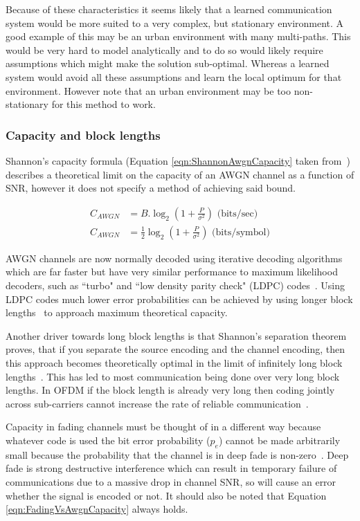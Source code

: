 \documentclass[12pt,onecolumn,letterpaper]{article}
\begin{document}
Because of these characteristics it seems likely that a learned communication system would be more suited to a very complex, but stationary environment. A good example of this may be an urban environment with many multi-paths. This would be very hard to model analytically and to do so would likely require assumptions which might make the solution sub-optimal. Whereas a learned system would avoid all these assumptions and learn the local optimum for that environment. However note that an urban environment may be too non-stationary for this method to work.

\subsubsection{Capacity and block lengths}

Shannon's capacity formula (Equation \ref{eqn:ShannonAwgnCapacity} taken from~\cite{WirelessTextbookC5}) describes a theoretical limit on the capacity of an AWGN channel as a function of SNR, however it does not specify a method of achieving said bound.

\begin{align}
    C_{AWGN} &= B.\log_2(1 + \frac{P}{\sigma^2})  \mbox{    (bits/sec)} \nonumber\\
    C_{AWGN} &= \frac{1}{2} \log_2(1 + \frac{P}{\sigma^2})  \mbox{    (bits/symbol)}
    \label{eqn:ShannonAwgnCapacity}
\end{align}

AWGN channels are now normally decoded using iterative decoding algorithms which are far faster but have very similar performance to maximum likelihood decoders, such as ``turbo" and ``low density parity check" (LDPC) codes~\cite{WirelessTextbookC5}. Using LDPC codes much lower error probabilities can be achieved by using longer block lengths~\cite{WirelessTextbookC5} to approach maximum theoretical capacity.

Another driver towards long block lengths is that Shannon's separation theorem proves, that if you separate the source encoding and the channel encoding, then this approach becomes theoretically optimal in the limit of infinitely long block lengths~\cite{ChannelEncodingOptimality}. This has led to most communication being done over very long block lengths. In OFDM if the block length is already very long then coding jointly across sub-carriers cannot increase the rate of reliable communication~\cite{WirelessTextbookC5}.

Capacity in fading channels must be thought of in a different way because whatever code is used the bit error probability ($p_e$) cannot be made arbitrarily small because the probability that the channel is in deep fade is non-zero~\cite{WirelessTextbookC5}. Deep fade is strong destructive interference which can result in temporary failure of communications due to a massive drop in channel SNR, so will cause an error whether the signal is encoded or not. It should also be noted that Equation \ref{eqn:FadingVsAwgnCapacity} always holds.
\end{document}
